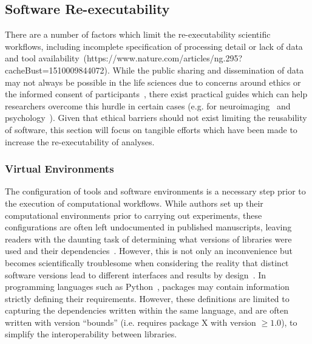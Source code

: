 \subsection{Software Re-executability}
There are a number of factors which limit the re-executability scientific workflows, including incomplete specification
of processing detail or lack of data and tool availability~\tocite (https://www.nature.com/articles/ng.295?cacheBust=1510009844072).
While the public sharing and dissemination of data may not always be possible in the life sciences due to concerns
around ethics or the informed consent of participants~\cite{ross2018ethical,duke2013ethics}, there exist practical
guides which can help researchers overcome this hurdle in certain cases (e.g. for
neuroimaging~\cite{brakewood2013ethics} and psychology~\cite{meyer2018practical}). Given that ethical barriers should
not exist limiting the reusability of software, this section will focus on tangible efforts which have been made to
increase the re-executability of analyses.

\subsubsection{Virtual Environments}
The configuration of tools and software environments is a necessary step prior to the execution of computational
workflows. While authors set up their computational environments prior to carrying out experiments, these
configurations are often left undocumented in published manuscripts, leaving readers with the daunting task of
determining what versions of libraries were used and their dependencies~\cite{robles2010replicating}. However, this is
not only an inconvenience but becomes scientifically troublesome when considering the reality that distinct software
versions lead to different interfaces and results by design~\cite{raymond1997cathedral}. In programming languages such
as Python~\cite{oliphant2007python}, packages may contain information strictly defining their requirements. However,
these definitions are limited to capturing the dependencies written within the same language, and are often written
with version ``bounds'' (i.e. requires package X with version $\geq 1.0$), to simplify the interoperability between
libraries.

